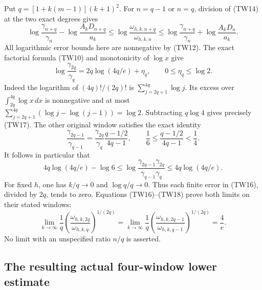 Put $q=[1+k(m-1)](k+1)^2$.  For $n=q-1$ or $n=q$, division of
(TW14) at the two exact degrees gives
\[
 \log\frac{\gamma_{n+q}}{\gamma_n}
       -\log\frac{A_kD_{n+q}}{a_k}
 \leq\log\frac{\omega_{h,k,n+q}}{\omega_{h,k,n}}
 \leq\log\frac{\gamma_{n+q}}{\gamma_n}
       +\log\frac{A_kD_n}{a_k}.
 \tag{TW16}
\]
All logarithmic error bounds here are nonnegative by (TW12).
The exact factorial formula (TW10) and monotonicity of $\log x$ give
\[
 \log\frac{\gamma_{2q}}{\gamma_q}
 =2q\log(4q/e)+\eta_q,\qquad 0\leq\eta_q\leq\log2.
 \tag{TW17}
\]
Indeed the logarithm of $(4q)!/(2q)!$ is
$\sum_{j=2q+1}^{4q}\log j$.  Its excess over
$\int_{2q}^{4q}\log x\,dx$ is nonnegative and at most
$\sum_{j=2q+1}^{4q}(\log j-\log(j-1))=\log2$.
Subtracting $q\log4$ gives precisely (TW17).
The other original window satisfies the exact identity
\[
 \frac{\gamma_{2q-1}}{\gamma_{q-1}}
 =\frac{\gamma_{2q}}{\gamma_q}\frac{q-1/2}{4q-1},
 \qquad \frac16\leq\frac{q-1/2}{4q-1}<\frac14.
\]
It follows in particular that
\[
 4q\log(4q/e)-\log6
 \leq\log\frac{\gamma_{2q-1}\gamma_{2q}}
                    {\gamma_{q-1}\gamma_q}
 \leq4q\log(4q/e).
 \tag{TW18}
\]
For fixed $h$, one has $k/q\to0$ and $\log q/q\to0$.
Thus each finite error in (TW16), divided by $2q$, tends to zero.
Equations (TW16)--(TW18) prove both limits on their stated windows:
\[
 \boxed{
 \lim_{k\to\infty}\frac1q
 \left(\frac{\omega_{h,k,2q}}{\omega_{h,k,q}}\right)^{1/(2q)}
 =\lim_{k\to\infty}\frac1q
 \left(\frac{\omega_{h,k,2q-1}}{\omega_{h,k,q-1}}\right)^{1/(2q)}
 =\frac4e.}\tag{TW19}
\]
No limit with an unspecified ratio $n/q$ is asserted.

\subsection{The resulting actual four-window lower estimate}


